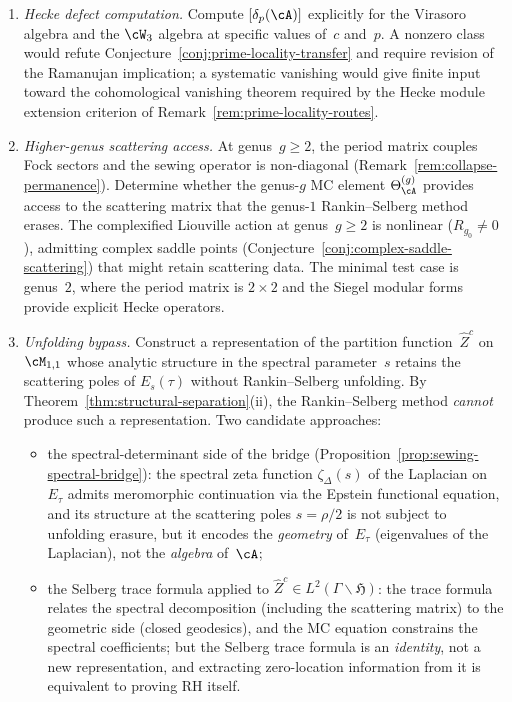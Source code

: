\begin{problem}%
\label{prob:ac-open-problems}%
\begin{enumerate}[label=\textup{(\Alph*)}]
\item
\emph{Hecke defect computation.}
Compute $[\delta_p(\cA)]$ explicitly for the Virasoro
algebra and the $\cW_3$ algebra at specific values
of~$c$ and~$p$. A nonzero class would refute
Conjecture~\ref{conj:prime-locality-transfer} and require
revision of the Ramanujan implication; a systematic vanishing
would give finite input toward the cohomological vanishing theorem
required by the Hecke module extension criterion of
Remark~\ref{rem:prime-locality-routes}.

\item
\emph{Higher-genus scattering access.}
At genus~$g \ge 2$, the period matrix couples Fock
sectors and the sewing operator is non-diagonal
(Remark~\ref{rem:collapse-permanence}).
Determine whether the genus-$g$ MC element
$\Theta_\cA^{(g)}$ provides access to the scattering
matrix that the genus-$1$ Rankin--Selberg method erases.
The complexified Liouville action at genus~$g \ge 2$ is
nonlinear ($R_{g_0} \ne 0$), admitting complex saddle
points (Conjecture~\ref{conj:complex-saddle-scattering})
that might retain scattering data. The minimal test case
is genus~$2$, where the period matrix is $2 \times 2$ and
the Siegel modular forms provide explicit Hecke operators.

\item
\emph{Unfolding bypass.}
Construct a representation of the partition
function~$\widehat{Z}^c$ on~$\cM_{1,1}$ whose analytic
structure in the spectral parameter~$s$ retains the
scattering poles of $E_s(\tau)$ without Rankin--Selberg
unfolding.
By Theorem~\ref{thm:structural-separation}(ii), the
Rankin--Selberg method \emph{cannot} produce such a
representation. Two candidate approaches:
\begin{itemize}[nosep]
\item the spectral-determinant side of the bridge
 (Proposition~\ref{prop:sewing-spectral-bridge}): the
 spectral zeta function $\zeta_\Delta(s)$ of the
 Laplacian on~$E_\tau$ admits meromorphic continuation
 via the Epstein functional equation, and its structure
 at the scattering poles $s = \rho/2$ is not subject to
 unfolding erasure, but it encodes the
 \emph{geometry} of~$E_\tau$ (eigenvalues of the
 Laplacian), not the \emph{algebra} of~$\cA$;
\item the Selberg trace formula applied to
 $\widehat{Z}^c \in L^2(\Gamma\backslash\mathfrak{H})$:
 the trace formula relates the spectral decomposition
 (including the scattering matrix) to the geometric
 side (closed geodesics), and the MC equation constrains
 the spectral coefficients; but the Selberg trace formula
 is an \emph{identity}, not a new representation, and
 extracting zero-location information from it is
 equivalent to proving RH itself.
\end{itemize}
\end{enumerate}
\end{problem}

